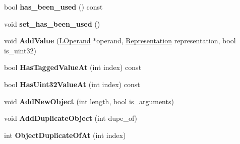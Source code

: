 \begin{DoxyCompactItemize}
\item 
\hypertarget{classv8_1_1internal_1_1_v8___f_i_n_a_l_a22f7a03194e7c357861f74e9506f7e45}{}bool {\bfseries has\+\_\+been\+\_\+used} () const \label{classv8_1_1internal_1_1_v8___f_i_n_a_l_a22f7a03194e7c357861f74e9506f7e45}

\item 
\hypertarget{classv8_1_1internal_1_1_v8___f_i_n_a_l_a343a2141eb34580c9840b82f34dd55cc}{}void {\bfseries set\+\_\+has\+\_\+been\+\_\+used} ()\label{classv8_1_1internal_1_1_v8___f_i_n_a_l_a343a2141eb34580c9840b82f34dd55cc}

\item 
\hypertarget{classv8_1_1internal_1_1_v8___f_i_n_a_l_a923820bc4ef30d6baf0f7b166053d0c5}{}void {\bfseries Add\+Value} (\hyperlink{classv8_1_1internal_1_1_l_operand}{L\+Operand} $\ast$operand, \hyperlink{classv8_1_1internal_1_1_representation}{Representation} representation, bool is\+\_\+uint32)\label{classv8_1_1internal_1_1_v8___f_i_n_a_l_a923820bc4ef30d6baf0f7b166053d0c5}

\item 
\hypertarget{classv8_1_1internal_1_1_v8___f_i_n_a_l_a26f32b3d7fdb625bc2705afeb7904d41}{}bool {\bfseries Has\+Tagged\+Value\+At} (int index) const \label{classv8_1_1internal_1_1_v8___f_i_n_a_l_a26f32b3d7fdb625bc2705afeb7904d41}

\item 
\hypertarget{classv8_1_1internal_1_1_v8___f_i_n_a_l_ad7360e3b455e048ed2e99200c8cccc84}{}bool {\bfseries Has\+Uint32\+Value\+At} (int index) const \label{classv8_1_1internal_1_1_v8___f_i_n_a_l_ad7360e3b455e048ed2e99200c8cccc84}

\item 
\hypertarget{classv8_1_1internal_1_1_v8___f_i_n_a_l_a6f3ec1bbd0694448e225efa280bf308f}{}void {\bfseries Add\+New\+Object} (int length, bool is\+\_\+arguments)\label{classv8_1_1internal_1_1_v8___f_i_n_a_l_a6f3ec1bbd0694448e225efa280bf308f}

\item 
\hypertarget{classv8_1_1internal_1_1_v8___f_i_n_a_l_a22210a09bec3beed375c837ba6c1ecdf}{}void {\bfseries Add\+Duplicate\+Object} (int dupe\+\_\+of)\label{classv8_1_1internal_1_1_v8___f_i_n_a_l_a22210a09bec3beed375c837ba6c1ecdf}

\item 
\hypertarget{classv8_1_1internal_1_1_v8___f_i_n_a_l_a246c233934296582f2c2229afab5aab4}{}int {\bfseries Object\+Duplicate\+Of\+At} (int index)\label{classv8_1_1internal_1_1_v8___f_i_n_a_l_a246c233934296582f2c2229afab5aab4}


\end{DoxyCompactItemize}
